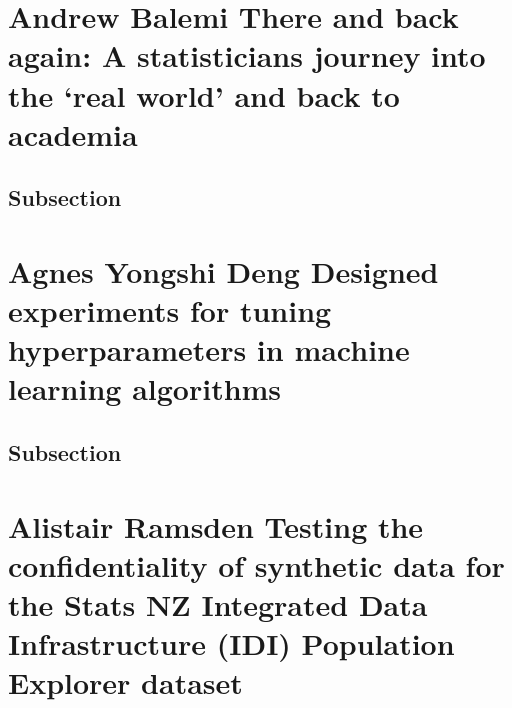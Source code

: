 \documentclass[
]{book}
\begin{document}
\hypertarget{andrew-balemi-there-and-back-again-a-statisticians-journey-into-the-real-world-and-back-to-academia}{%
\chapter*{Andrew Balemi \textbar{} There and back again: A statisticians journey into the `real world' and back to academia}\label{andrew-balemi-there-and-back-again-a-statisticians-journey-into-the-real-world-and-back-to-academia}}

\hypertarget{subsection}{%
\section{Subsection}\label{subsection}}

\hypertarget{agnes-yongshi-deng-designed-experiments-for-tuning-hyperparameters-in-machine-learning-algorithms}{%
\chapter*{Agnes Yongshi Deng \textbar{} Designed experiments for tuning hyperparameters in machine learning algorithms}\label{agnes-yongshi-deng-designed-experiments-for-tuning-hyperparameters-in-machine-learning-algorithms}}

\hypertarget{subsection}{%
\section{Subsection}\label{subsection}}

\hypertarget{alistair-ramsden-testing-the-confidentiality-of-synthetic-data-for-the-stats-nz-integrated-data-infrastructure-idi-population-explorer-dataset}{%
\chapter*{Alistair Ramsden \textbar{} Testing the confidentiality of synthetic data for the Stats NZ Integrated Data Infrastructure (IDI) Population Explorer dataset}\label{alistair-ramsden-testing-the-confidentiality-of-synthetic-data-for-the-stats-nz-integrated-data-infrastructure-idi-population-explorer-dataset}}
\end{document}
